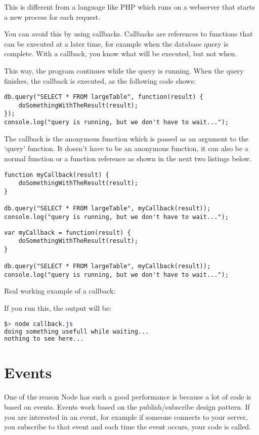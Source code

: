 \documentclass[a4paper]{report}
\begin{document}
This is different from a language like PHP which runs on a webserver that starts a new process for each request.

You can avoid this by using callbacks. Callbacks are references to functions that can be executed at a later time, for example when the database query is complete. With a callback, you know what will be executed, but not when.

This way, the program continues while the query is running. When the query finishes, the callback is executed, as the following code shows:

\begin{lstlisting}
db.query("SELECT * FROM largeTable", function(result) {
	doSomethingWithTheResult(result);
});
console.log("query is running, but we don't have to wait...");
\end{lstlisting}

\noindent The callback is the anonymous function which is passed as an argument to the `query' function. It doesn't have to be an anonymous function, it can also be a normal function or a function reference as shown in the next two listings below.

\begin{lstlisting}
function myCallback(result) {
	doSomethingWithTheResult(result);
}

db.query("SELECT * FROM largeTable", myCallback(result));
console.log("query is running, but we don't have to wait...");
\end{lstlisting}

\begin{lstlisting}
var myCallback = function(result) {
	doSomethingWithTheResult(result);
}

db.query("SELECT * FROM largeTable", myCallback(result));
console.log("query is running, but we don't have to wait...");
\end{lstlisting}

\noindent Real working example of a callback:

If you run this, the output will be:
\begin{lstlisting}[language=css]
$> node callback.js 
doing something usefull while waiting...
nothing to see here...
\end{lstlisting}

\section*{Events}
One of the reason Node has such a good performance is because a lot of code is based on events. Events work based on the publish/subscribe design pattern. If you are interested in an event, for example if someone connects to your server, you subscribe to that event and each time the event occurs, your code is called.
\end{document}
